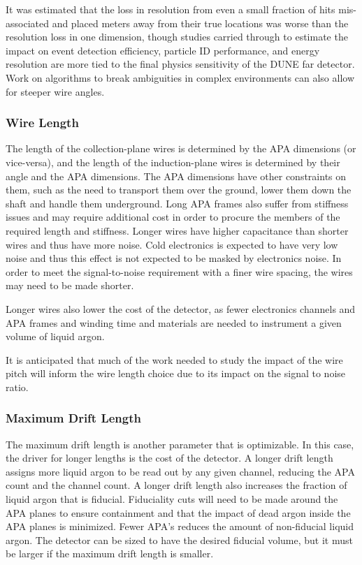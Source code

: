 It was estimated that the loss in resolution from even a small
fraction of hits mis-associated and placed meters away from their true
locations was worse than the resolution loss in one
dimension\cite{docdb-8981}, though studies carried through to
estimate the impact on event detection efficiency, particle ID
performance, and energy resolution are more tied to the final physics
sensitivity of the DUNE far detector.  Work on algorithms to break
ambiguities in complex environments can also allow for steeper wire
angles.

\subsubsection{Wire Length}

The length of the collection-plane wires is determined by the APA dimensions (or vice-versa),
and the length of the induction-plane wires is determined by their angle and the APA
dimensions.  The APA dimensions have other constraints on them, such as the need to transport
them over the ground, lower them down the shaft and handle them underground.  Long APA frames
also suffer from stiffness issues and may require additional cost in order to procure the
members of the required length and stiffness.  Longer wires have higher capacitance than shorter
wires and thus have more noise.  Cold electronics is expected to have very low noise and thus
this effect is not expected to be masked by electronics noise.  In order to meet the signal-to-noise
requirement with a finer wire spacing, the wires may need to be made shorter.

Longer wires also lower the cost of the detector, as fewer electronics channels and APA frames
and winding time and materials are needed to instrument a given volume of liquid argon.

It is anticipated that much of the work needed to study the impact of the wire pitch will inform
the wire length choice due to its impact on the signal to noise ratio.

\subsubsection{Maximum Drift Length}

The maximum drift length is another parameter that is optimizable.  In
this case, the driver for longer lengths is the cost of the detector.
A longer drift length assigns more liquid argon to be read out by any
given channel, reducing the APA count and the channel count.  A longer
drift length also increases the fraction of liquid argon that is
fiducial.  Fiduciality cuts will need to be made around the APA planes
to ensure containment and that the impact of dead argon inside the APA
planes is minimized.  Fewer APA's reduces the amount of non-fiducial
liquid argon.  The detector can be sized to have the desired fiducial
volume, but it must be larger if the maximum drift length is smaller.

